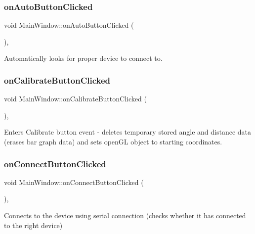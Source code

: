 \subsubsection{on\+Auto\+Button\+Clicked}
{\footnotesize\ttfamily void Main\+Window\+::on\+Auto\+Button\+Clicked (\begin{DoxyParamCaption}{ }\end{DoxyParamCaption})\hspace{0.3cm}{\ttfamily [private]}, {\ttfamily [slot]}}



Automatically looks for proper device to connect to. 

\mbox{\label{class_main_window_ac895c6f8aae08ca6debe77314d640936}} 
\subsubsection{on\+Calibrate\+Button\+Clicked}
{\footnotesize\ttfamily void Main\+Window\+::on\+Calibrate\+Button\+Clicked (\begin{DoxyParamCaption}{ }\end{DoxyParamCaption})\hspace{0.3cm}{\ttfamily [private]}, {\ttfamily [slot]}}



Enters Calibrate button event -\/ deletes temporary stored angle and distance data (erases bar graph data) and sets open\+GL object to starting coordinates. 

\mbox{\label{class_main_window_a3546900c922ca780ef575dd9aa8f9906}} 
\subsubsection{on\+Connect\+Button\+Clicked}
{\footnotesize\ttfamily void Main\+Window\+::on\+Connect\+Button\+Clicked (\begin{DoxyParamCaption}{ }\end{DoxyParamCaption})\hspace{0.3cm}{\ttfamily [private]}, {\ttfamily [slot]}}



Connects to the device using serial connection (checks whether it has connected to the right device) 

